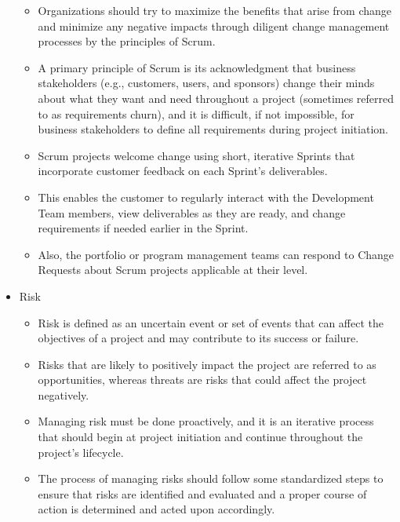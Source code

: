\documentclass[letterpaper,10pt,english]{jupyterBook}
\begin{document}
\begin{itemize}
\begin{itemize}
\item {} 
\sphinxAtStartPar
Organizations should try to maximize the benefits that arise from change and minimize any negative impacts
through diligent change management processes by the principles of Scrum.

\item {} 
\sphinxAtStartPar
A primary principle of Scrum is its acknowledgment that business stakeholders (e.g., customers, users, and sponsors) change their minds about what they want and need throughout a project (sometimes referred to as requirements churn), and it is difficult, if not impossible, for business stakeholders to define all requirements during project initiation.

\item {} 
\sphinxAtStartPar
Scrum projects welcome change using short, iterative Sprints that incorporate customer feedback on each Sprint’s deliverables.

\item {} 
\sphinxAtStartPar
This enables the customer to regularly interact with the Development Team members, view deliverables as they are ready, and change requirements if needed earlier in the Sprint.

\item {} 
\sphinxAtStartPar
Also, the portfolio or program management teams can respond to Change Requests about Scrum projects
applicable at their level.

\end{itemize}

\item {} 
\sphinxAtStartPar
Risk
\begin{itemize}
\item {} 
\sphinxAtStartPar
Risk is defined as an uncertain event or set of events that can affect the objectives of a project and may
contribute to its success or failure.

\item {} 
\sphinxAtStartPar
Risks that are likely to positively impact the project are referred to as opportunities, whereas threats are risks that could affect the project negatively.

\item {} 
\sphinxAtStartPar
Managing risk must be done proactively, and it is an iterative process that should begin at project initiation and continue throughout the project’s lifecycle.

\item {} 
\sphinxAtStartPar
The process of managing risks should follow some standardized steps to ensure that risks are identified and evaluated and a proper course of action is determined and acted upon accordingly.


\end{itemize}
\end{itemize}
\end{document}

